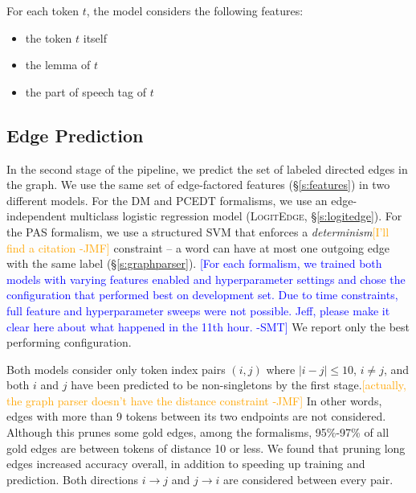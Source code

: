 \documentclass[11pt]{article}
\newcommand{\bocomment}[1]{\textcolor{Bittersweet}{[#1 -BTO]}}
\newcommand{\sam}[1]{\textcolor{blue}{[#1 -SMT]}}
\newcommand{\jmf}[1]{\textcolor{orange}{[#1 -JMF]}}
\newcommand{\logitedge}{\textsc{LogitEdge}}
\begin{document}
For each token $t$, the model considers the following features:
\begin{itemize}
\item the token $t$ itself
\item the lemma of $t$
\item the part of speech tag of $t$
\end{itemize}



\subsection{Edge Prediction} \label{s:edge_model}

In the second stage of the pipeline, we predict the set of labeled directed
edges in the graph.
We use the same set of edge-factored features (\S\ref{s:features}) in two
different models.
For the DM and PCEDT formalisms, we use an edge-independent multiclass logistic
regression model (\logitedge, \S\ref{s:logitedge}).
For the PAS formalism, we use a structured SVM 
\cite{taskar_max_2003,tsochantaridis_support_2004} that enforces a
\emph{determinism}\jmf{I'll find a citation} constraint -- a word can
have at most one outgoing edge with the
same label (\S\ref{s:graphparser}).
\sam{For each formalism, we trained both models with varying features enabled
and hyperparameter settings and chose the configuration that performed best on
development set.
Due to time constraints, full feature and hyperparameter sweeps were not
possible.
Jeff, please make it clear here about what happened in the 11th
hour.}
We report only the best performing configuration.

Both models consider only token index pairs $(i, j)$ where %
$|i-j| \leq 10$, $i \ne j$, and both $i$ and
$j$ have been predicted to be non-singletons by the first stage.\jmf{actually, the graph parser doesn't have the distance constraint}
In other words, edges with more than 9 tokens between its two endpoints are not
considered.
Although this prunes some gold edges, among the formalisms,
95\%-97\% of all gold edges are between tokens of distance 10 or less.
We found that pruning long edges increased accuracy overall, in addition to
speeding up training and prediction.
Both directions $i \rightarrow j$ and $j \rightarrow
i$ are considered between every pair.
\end{document}
